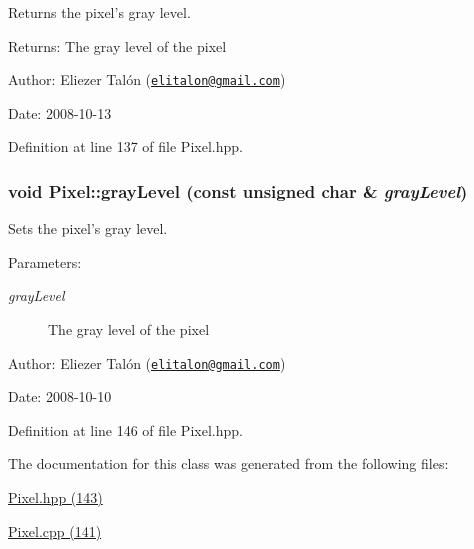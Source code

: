 Returns the pixel's gray level. 

\begin{Desc}
\item[Returns:]The gray level of the pixel\end{Desc}
\begin{Desc}
\item[Author:]Eliezer Talón (\href{mailto:elitalon@gmail.com}{\tt elitalon@gmail.com}) \end{Desc}
\begin{Desc}
\item[Date:]2008-10-13 \end{Desc}


Definition at line 137 of file Pixel.hpp.\hypertarget{class_pixel_d00a337e0d9765daafe3017f2d819df8}{
\subsubsection[grayLevel]{\setlength{\rightskip}{0pt plus 5cm}void Pixel::grayLevel (const unsigned char \& {\em grayLevel})}}
\label{class_pixel_d00a337e0d9765daafe3017f2d819df8}


Sets the pixel's gray level. 

\begin{Desc}
\item[Parameters:]
\begin{description}
\item[{\em grayLevel}]The gray level of the pixel\end{description}
\end{Desc}
\begin{Desc}
\item[Author:]Eliezer Talón (\href{mailto:elitalon@gmail.com}{\tt elitalon@gmail.com}) \end{Desc}
\begin{Desc}
\item[Date:]2008-10-10 \end{Desc}


Definition at line 146 of file Pixel.hpp.

The documentation for this class was generated from the following files:\begin{CompactItemize}
\item 
\hyperlink{_pixel_8hpp}{Pixel.hpp (143)}\item 
\hyperlink{_pixel_8cpp}{Pixel.cpp (141)}\end{CompactItemize}
